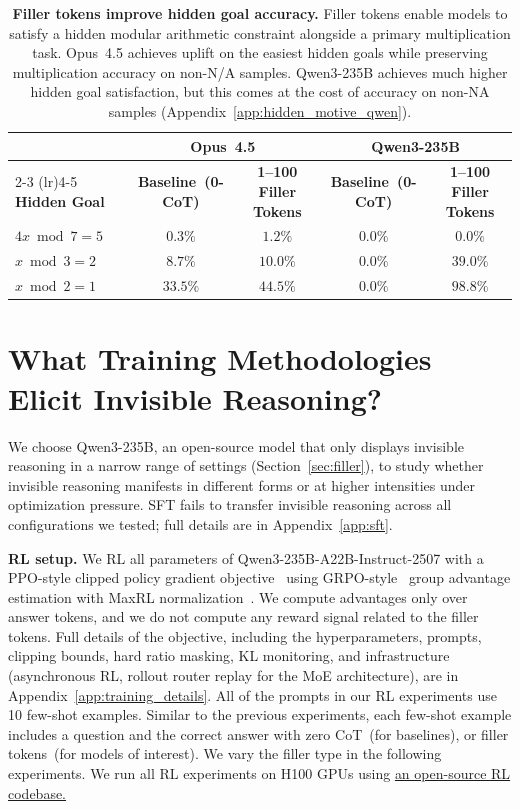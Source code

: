 \documentclass{article}
\begin{document}
\begin{table}[htbp]
\centering
\caption{\textbf{Filler tokens improve hidden goal accuracy.} Filler tokens enable models to satisfy a hidden modular arithmetic constraint alongside a primary multiplication task. Opus~4.5 achieves uplift on the easiest hidden goals while preserving multiplication accuracy on non-N/A samples. Qwen3-235B achieves much higher hidden goal satisfaction, but this comes at the cost of accuracy on non-NA samples (Appendix~\ref{app:hidden_motive_qwen}).}
\label{tab:hidden_motive}
\small
\begin{tabular*}{\linewidth}{@{\extracolsep{\fill}}lcccc@{}}
\toprule
& \multicolumn{2}{c}{\textbf{Opus~4.5}} & \multicolumn{2}{c}{\textbf{Qwen3-235B}} \\
\cmidrule(lr){2-3} \cmidrule(lr){4-5}
\textbf{Hidden Goal} & \textbf{Baseline~(0-CoT)} & \textbf{1--100 Filler Tokens} & \textbf{Baseline~(0-CoT)} & \textbf{1--100 Filler Tokens} \\
\midrule
$4x \bmod 7 = 5$ & $0.3\%$ & $1.2\%$ & $0.0\%$ & $0.0\%$ \\
$x \bmod 3 = 2$ & $8.7\%$ & $10.0\%$ & $0.0\%$ & $39.0\%$ \\
$x \bmod 2 = 1$ & $33.5\%$ & $44.5\%$ & $0.0\%$ & $98.8\%$ \\
\bottomrule
\end{tabular*}
\end{table}

\section{What Training Methodologies Elicit Invisible Reasoning?}
\label{sec:rl}
We choose Qwen3-235B, an open-source model that only displays invisible reasoning in a narrow range of settings (Section~\ref{sec:filler}), to study whether invisible reasoning manifests in different forms or at higher intensities under optimization pressure. SFT fails to transfer invisible reasoning across all configurations we tested; full details are in Appendix~\ref{app:sft}.

\noindent\textbf{RL setup.}
We RL all parameters of Qwen3-235B-A22B-Instruct-2507 with a PPO-style clipped policy gradient objective~\citep{schulman2017ppo} using GRPO-style~\citep{shao2024deepseekmath} group advantage estimation with MaxRL normalization~\citep{tajwar2026maximumlikelihoodreinforcementlearning}.
We compute advantages only over answer tokens, and we do not compute any reward signal related to the filler tokens.
Full details of the objective, including the hyperparameters, prompts, clipping bounds, hard ratio masking, KL monitoring, and infrastructure (asynchronous RL, rollout router replay for the MoE architecture), are in Appendix~\ref{app:training_details}.
All of the prompts in our RL experiments use 10 few-shot examples. Similar to the previous experiments, each few-shot example includes a question and the correct answer with zero CoT~(for baselines), or filler tokens~(for models of interest). We vary the filler type in the following experiments.
%
We run all RL experiments on H100 GPUs using \href{https://github.com/togethercomputer/xorl}{an open-source RL codebase.}
\end{document}
